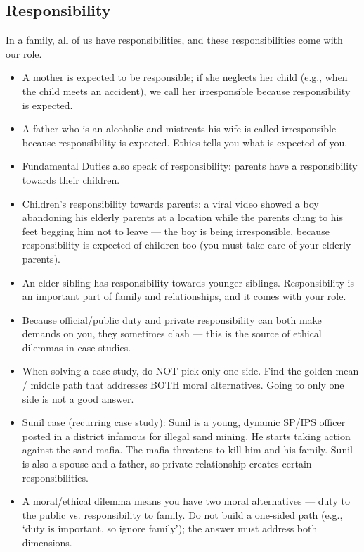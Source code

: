 \subsection{Responsibility}

In a family, all of us have responsibilities, and these responsibilities come with our role.

\begin{itemize}
\item A mother is expected to be responsible; if she neglects her child (e.g., when the child meets an accident), we call her irresponsible because responsibility is expected.
\item A father who is an alcoholic and mistreats his wife is called irresponsible because responsibility is expected. Ethics tells you what is expected of you.
\item Fundamental Duties also speak of responsibility: parents have a responsibility towards their children.
\item Children's responsibility towards parents: a viral video showed a boy abandoning his elderly parents at a location while the parents clung to his feet begging him not to leave --- the boy is being irresponsible, because responsibility is expected of children too (you must take care of your elderly parents).
\item An elder sibling has responsibility towards younger siblings. Responsibility is an important part of family and relationships, and it comes with your role.
\end{itemize}

\begin{CriticalPoint}
\begin{itemize}
\item Because official/public duty and private responsibility can both make demands on you, they sometimes clash --- this is the source of ethical dilemmas in case studies.
\item When solving a case study, do NOT pick only one side. Find the golden mean / middle path that addresses BOTH moral alternatives. Going to only one side is not a good answer.
\end{itemize}
\end{CriticalPoint}

\begin{ExampleBox}
\begin{itemize}
\item Sunil case (recurring case study): Sunil is a young, dynamic SP/IPS officer posted in a district infamous for illegal sand mining. He starts taking action against the sand mafia. The mafia threatens to kill him and his family. Sunil is also a spouse and a father, so private relationship creates certain responsibilities.
\item A moral/ethical dilemma means you have two moral alternatives --- duty to the public vs. responsibility to family. Do not build a one-sided path (e.g., `duty is important, so ignore family'); the answer must address both dimensions.
\end{itemize}
\end{ExampleBox}

